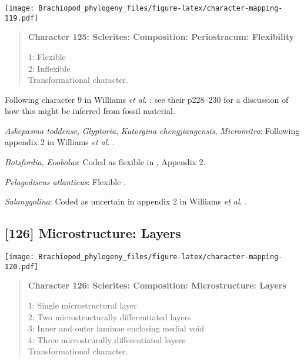 \documentclass[openany]{book}
\theoremstyle{definition}
\theoremstyle{definition}
\theoremstyle{definition}
\theoremstyle{remark}
\begin{document}
\texttt{[image: Brachiopod\_phylogeny\_files/figure-latex/character-mapping-119.pdf]}

\begin{quote}
\textbf{Character 125: Sclerites: Composition: Periostracum:
Flexibility}

1: Flexible\\
2: Inflexible\\
Transformational character.
\end{quote}

Following character 9 in Williams \emph{et al}.
\citeyearpar{Williams1998Thediversity}; see their p228--230 for a
discussion of how this might be inferred from fossil material.

\hypertarget{Askepasma_toddense-coding-125}{}
\emph{Askepasma toddense}, \emph{Glyptoria}, \emph{Kutorgina
chengjiangensis}, \emph{Micromitra}: Following appendix 2 in Williams
\emph{et al}. \citeyearpar{Williams1998Thediversity}.

\hypertarget{Botsfordia-coding-125}{}
\emph{Botsfordia}, \emph{Eoobolus}: Coded as flexible in
\citet{Williams1998Thediversity}, Appendix 2.

\hypertarget{Pelagodiscus_atlanticus-coding-125}{}
\emph{Pelagodiscus atlanticus}: Flexible
\citep{Williams1998Thediversity}.

\hypertarget{Salanygolina-coding-125}{}
\emph{Salanygolina}: Coded as uncertain in appendix 2 in Williams
\emph{et al}. \citeyearpar{Williams1998Thediversity}.

\subsection*{{[}126{]} Microstructure:
Layers}\label{microstructure-layers}

\texttt{[image: Brachiopod\_phylogeny\_files/figure-latex/character-mapping-120.pdf]}

\begin{quote}
\textbf{Character 126: Sclerites: Composition: Microstructure: Layers}

1: Single microstructural layer\\
2: Two microstructurally differentiated layers\\
3: Inner and outer laminae enclosing medial void\\
4: Three microstrurally differentiated layers\\
Transformational character.
\end{quote}
\end{document}
